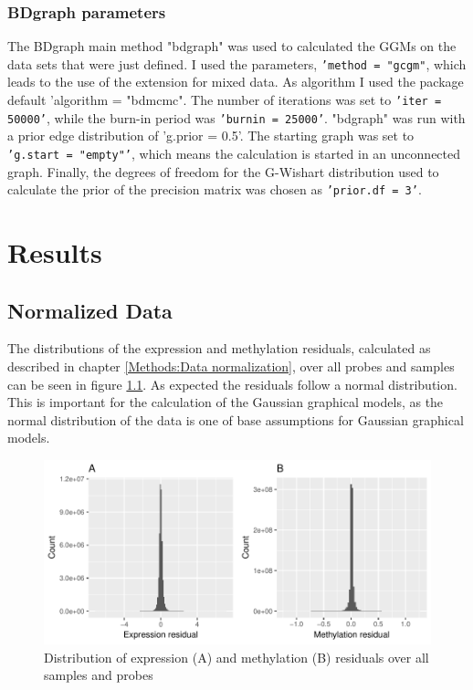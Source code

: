 \documentclass[a4paper,12pt,twoside,openright]{report}
\begin{document}
\subsection{BDgraph parameters}
\label{Methods:BDgraph parameters}
The BDgraph main method "bdgraph" was used to calculated the GGMs on the data sets that were just defined. I used the parameters, \texttt{'method = "gcgm"}, which leads to the use of the extension for mixed data. As algorithm I used the package default 'algorithm = "bdmcmc". The number of iterations was set to \texttt{'iter = 50000'}, while the burn-in period was \texttt{'burnin = 25000'}. "bdgraph" was run with a prior edge distribution of 'g.prior = 0.5'. The starting graph was set to \texttt{'g.start = "empty"'}, which means the calculation is started in an unconnected graph. Finally, the degrees of freedom for the G-Wishart distribution used to calculate the prior of the precision matrix was chosen as \texttt{'prior.df = 3'}.



\newpage
\chapter{Results}
\label{Results}
\section{Normalized Data}
\label{Results:Normalized Data}
The distributions of the expression and methylation residuals, calculated as described in chapter \ref{Methods:Data normalization}, over all probes and samples can be seen in figure \ref{fig:expr.meth.res.hist}. As expected the residuals follow a normal distribution. This is important for the calculation of the Gaussian graphical models, as the normal distribution of the data is one of base assumptions for Gaussian graphical models\cite{}.

\begin{figure}[b!]
	\includegraphics[scale=1, keepaspectratio = true]{../figures/expr_meth_res_hist}
	\caption{Distribution of expression (A) and methylation (B) residuals over all samples and probes}
	\label{fig:expr.meth.res.hist}
\end{figure}
\end{document}
